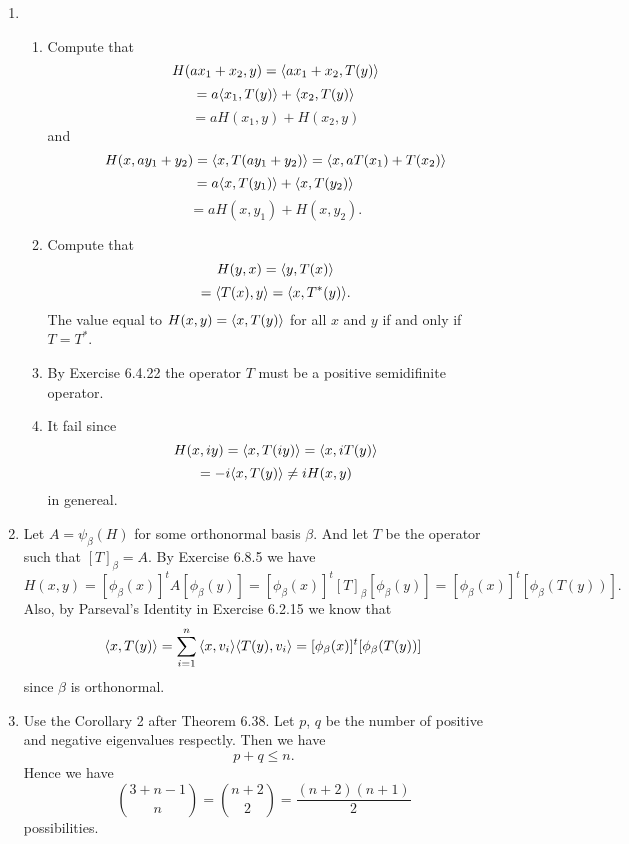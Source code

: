 \begin{enumerate}
\item \begin{enumerate}
\item Compute that
\[H(ax_1+x_2,y)=\langle ax_1+x_2,T(y)\rangle \]
\[=a\langle x_1,T(y)\rangle +\langle x_2,T(y)\rangle \]
\[=aH(x_1,y)+H(x_2,y)\]
and 
\[H(x,ay_1+y_2)=\langle x,T(ay_1+y_2)\rangle =\langle x,aT(x_1)+T(x_2)\rangle \]
\[=a\langle x,T(y_1)\rangle +\langle x,T(y_2)\rangle \]
\[=aH(x,y_1)+H(x,y_2).\]
\item Compute that 
\[H(y,x)=\langle y,T(x)\rangle \]
\[=\langle T(x),y\rangle =\langle x,T^*(y)\rangle .\]
The value equal to $H(x,y)=\langle x,T(y)\rangle $ for all $x$ and $y$ if and only if $T=T^*$.
\item By Exercise 6.4.22 the operator $T$ must be a positive semidifinite operator.
\item It fail since 
\[H(x,iy)=\langle x,T(iy)\rangle =\langle x,iT(y)\rangle \]
\[=-i\langle x,T(y)\rangle \neq iH(x,y)\]
in genereal.
\end{enumerate}
\item Let $A=\psi_{\beta}(H)$ for some orthonormal basis $\beta$. And let $T$ be the operator such that $[T]_{\beta}=A$. By Exercise 6.8.5 we have 
\[H(x,y)=[\phi_{\beta}(x)]^tA[\phi_{\beta}(y)]=[\phi_{\beta}(x)]^t[T]_{\beta}[\phi_{\beta}(y)]=[\phi_{\beta}(x)]^t[\phi_{\beta}(T(y))].\]
Also, by Parseval's Identity in Exercise 6.2.15 we know that 
\[\langle x,T(y)\rangle =\sum_{i=1}^n{\langle x,v_i\rangle\langle T(y),v_i\rangle}=[\phi_{\beta}(x)]^t[\phi_{\beta}(T(y))]\]
since $\beta$ is orthonormal.
\item Use the Corollary 2 after Theorem 6.38. Let $p$, $q$ be the number of positive and negative eigenvalues respectly. Then we have 
\[p+q\leq n.\]
Hence we have 
\[{3+n-1 \choose n}={n+2 \choose 2}=\frac{(n+2)(n+1)}{2}\]
possibilities.
\end{enumerate}